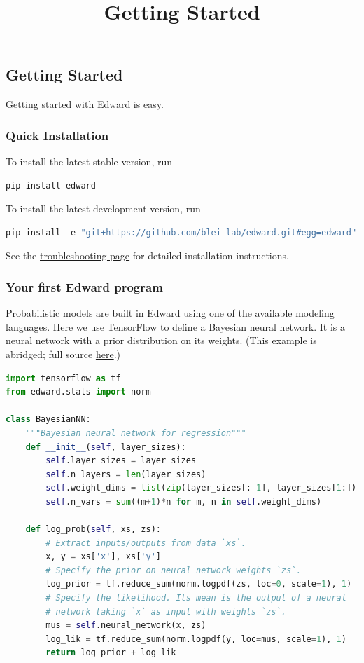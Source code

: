 \title{Getting Started}

\subsection{Getting Started}
Getting started with Edward is easy.

\subsubsection{Quick Installation}
To install the latest stable version, run

\begin{lstlisting}[language=Java]
pip install edward
\end{lstlisting}

To install the latest development version, run

\begin{lstlisting}[language=Java]
pip install -e "git+https://github.com/blei-lab/edward.git#egg=edward"
\end{lstlisting}

See the \href{troubleshooting.html}{troubleshooting page} for detailed
installation instructions.


\subsubsection{Your first Edward program}

Probabilistic models are built in Edward using one of the available
modeling languages. Here we use TensorFlow to define a Bayesian neural
network. It is a neural network with a prior distribution on its
weights.
(This example is abridged; full source
\href{https://github.com/blei-lab/edward/blob/master/examples/getting_started_example.py}
{here}.)
\begin{lstlisting}[language=Python]
import tensorflow as tf
from edward.stats import norm

class BayesianNN:
    """Bayesian neural network for regression"""
    def __init__(self, layer_sizes):
        self.layer_sizes = layer_sizes
        self.n_layers = len(layer_sizes)
        self.weight_dims = list(zip(layer_sizes[:-1], layer_sizes[1:]))
        self.n_vars = sum((m+1)*n for m, n in self.weight_dims)

    def log_prob(self, xs, zs):
        # Extract inputs/outputs from data `xs`.
        x, y = xs['x'], xs['y']
        # Specify the prior on neural network weights `zs`.
        log_prior = tf.reduce_sum(norm.logpdf(zs, loc=0, scale=1), 1)
        # Specify the likelihood. Its mean is the output of a neural
        # network taking `x` as input with weights `zs`.
        mus = self.neural_network(x, zs)
        log_lik = tf.reduce_sum(norm.logpdf(y, loc=mus, scale=1), 1)
        return log_prior + log_lik
\end{lstlisting}

